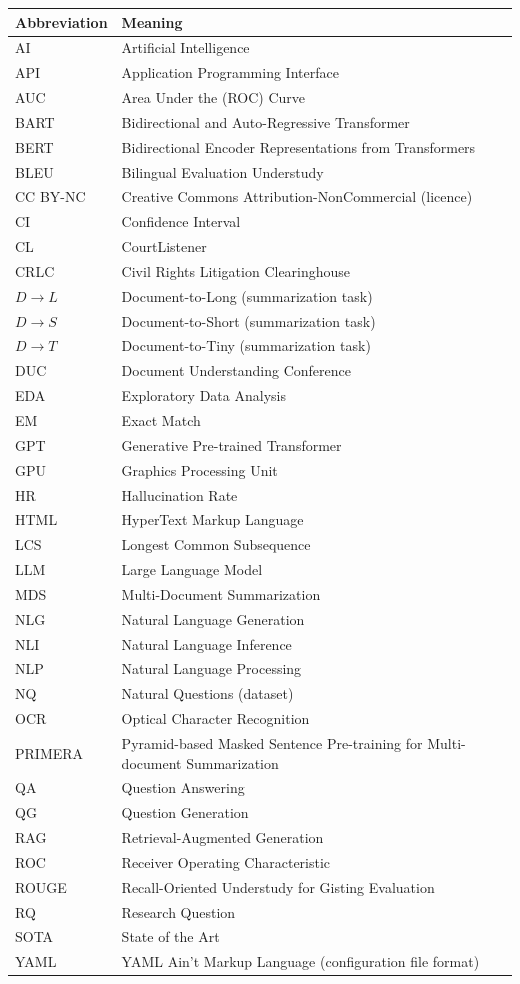 \begin{longtable}{@{}p{3.2cm}p{10cm}@{}}
\toprule
\textbf{Abbreviation} & \textbf{Meaning} \\
\midrule
\endhead
AI & Artificial Intelligence \\
API & Application Programming Interface \\
AUC & Area Under the (ROC) Curve \\
BART & Bidirectional and Auto-Regressive Transformer \\
BERT & Bidirectional Encoder Representations from Transformers \\
BLEU & Bilingual Evaluation Understudy \\
CC BY-NC & Creative Commons Attribution-NonCommercial (licence) \\
CI & Confidence Interval \\
CL & CourtListener \\
CRLC & Civil Rights Litigation Clearinghouse \\
$D \rightarrow L$ & Document-to-Long (summarization task) \\
$D \rightarrow S$ & Document-to-Short (summarization task) \\
$D \rightarrow T$ & Document-to-Tiny (summarization task) \\
DUC & Document Understanding Conference \\
EDA & Exploratory Data Analysis \\
EM & Exact Match \\
GPT & Generative Pre-trained Transformer \\
GPU & Graphics Processing Unit \\
HR & Hallucination Rate \\
HTML & HyperText Markup Language \\
LCS & Longest Common Subsequence \\
LLM & Large Language Model \\
MDS & Multi-Document Summarization \\
NLG & Natural Language Generation \\
NLI & Natural Language Inference \\
NLP & Natural Language Processing \\
NQ & Natural Questions (dataset) \\
OCR & Optical Character Recognition \\
PRIMERA & Pyramid-based Masked Sentence Pre-training for Multi-document Summarization \cite{xiao2022primera} \\
QA & Question Answering \\
QG & Question Generation \\
RAG & Retrieval-Augmented Generation \\
ROC & Receiver Operating Characteristic \\
ROUGE & Recall-Oriented Understudy for Gisting Evaluation \\
RQ & Research Question \\
SOTA & State of the Art \\
YAML & YAML Ain't Markup Language (configuration file format) \\
\bottomrule
\end{longtable}
